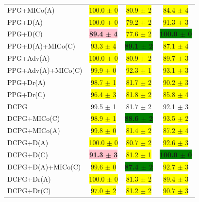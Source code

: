 \begin{table}[!h]
\begin{center}
\begin{tabular}{l|c|c|c}
PPG+MICo(A) & \colorbox{yellow}{100.0 $\pm$ 0 } & \colorbox{yellow}{80.9 $\pm$ 2 } & \colorbox{yellow}{84.4 $\pm$ 4 } \\ 
PPG+D(A) & \colorbox{yellow}{100.0 $\pm$ 0 } & \colorbox{yellow}{79.2 $\pm$ 2 } & \colorbox{yellow}{91.3 $\pm$ 3 } \\ 
PPG+D(C) & \textbf{\colorbox{pink}{89.4 $\pm$ 4 }} & \colorbox{yellow}{77.6 $\pm$ 2 } & \textbf{\colorbox{green}{100.0 $\pm$ 0 }} \\ 
PPG+D(A)+MICo(C) & \colorbox{yellow}{93.3 $\pm$ 4 } & \textbf{\colorbox{green}{89.1 $\pm$ 2 }} & \colorbox{yellow}{87.1 $\pm$ 4 } \\ 
PPG+Adv(A) & \colorbox{yellow}{100.0 $\pm$ 0 } & \colorbox{yellow}{80.9 $\pm$ 2 } & \colorbox{yellow}{89.7 $\pm$ 3 } \\ 
PPG+Adv(A)+MICo(C) & \colorbox{yellow}{99.9 $\pm$ 0 } & \colorbox{yellow}{92.3 $\pm$ 1 } & \colorbox{yellow}{93.1 $\pm$ 3 } \\ 
PPG+Dr(A) & \colorbox{yellow}{98.7 $\pm$ 1 } & \colorbox{yellow}{81.7 $\pm$ 2 } & \colorbox{yellow}{90.2 $\pm$ 3 } \\ 
PPG+Dr(C) & \colorbox{yellow}{96.4 $\pm$ 3 } & \colorbox{yellow}{81.8 $\pm$ 2 } & \colorbox{yellow}{85.8 $\pm$ 4 } \\ \hline
DCPG & 99.5 $\pm$ 1 & 81.7 $\pm$ 2 & 92.1 $\pm$ 3 \\
DCPG+MICo(C) & \colorbox{yellow}{98.9 $\pm$ 1 } & \textbf{\colorbox{green}{88.6 $\pm$ 2 }} & \colorbox{yellow}{93.5 $\pm$ 2 } \\ 
DCPG+MICo(A) & \colorbox{yellow}{99.8 $\pm$ 0 } & \colorbox{yellow}{81.4 $\pm$ 2 } & \colorbox{yellow}{87.2 $\pm$ 4 } \\ 
DCPG+D(A) & \colorbox{yellow}{100.0 $\pm$ 0 } & \colorbox{yellow}{80.7 $\pm$ 2 } & \colorbox{yellow}{92.6 $\pm$ 3 } \\ 
DCPG+D(C) & \textbf{\colorbox{pink}{91.3 $\pm$ 3 }} & \colorbox{yellow}{81.2 $\pm$ 1 } & \textbf{\colorbox{green}{100.0 $\pm$ 0 }} \\ 
DCPG+D(A)+MICo(C) & \colorbox{yellow}{99.6 $\pm$ 0 } & \textbf{\colorbox{green}{87.4 $\pm$ 2 }} & \colorbox{yellow}{92.7 $\pm$ 3 } \\ 
DCPG+Dr(A) & \colorbox{yellow}{100.0 $\pm$ 0 } & \colorbox{yellow}{81.3 $\pm$ 2 } & \colorbox{yellow}{89.4 $\pm$ 3 } \\ 
DCPG+Dr(C) & \colorbox{yellow}{97.0 $\pm$ 2 } & \colorbox{yellow}{81.2 $\pm$ 2 } & \colorbox{yellow}{90.7 $\pm$ 3 } \\ 
\end{tabular}
\end{center}
\end{table}

